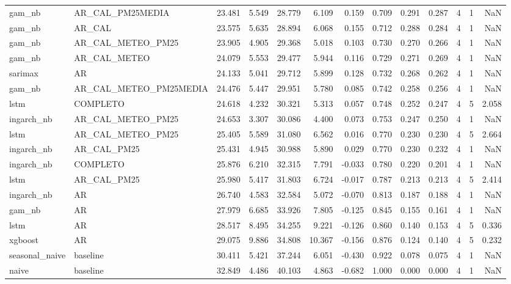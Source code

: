 \begin{tabular}{llrrrrrrrrrrr}
gam_nb & AR_CAL_PM25MEDIA & 23.481 & 5.549 & 28.779 & 6.109 & 0.159 & 0.709 & 0.291 & 0.287 & 4 & 1 & NaN \\
gam_nb & AR_CAL & 23.575 & 5.635 & 28.894 & 6.068 & 0.155 & 0.712 & 0.288 & 0.284 & 4 & 1 & NaN \\
gam_nb & AR_CAL_METEO_PM25 & 23.905 & 4.905 & 29.368 & 5.018 & 0.103 & 0.730 & 0.270 & 0.266 & 4 & 1 & NaN \\
gam_nb & AR_CAL_METEO & 24.079 & 5.553 & 29.477 & 5.944 & 0.116 & 0.729 & 0.271 & 0.269 & 4 & 1 & NaN \\
sarimax & AR & 24.133 & 5.041 & 29.712 & 5.899 & 0.128 & 0.732 & 0.268 & 0.262 & 4 & 1 & NaN \\
gam_nb & AR_CAL_METEO_PM25MEDIA & 24.476 & 5.447 & 29.951 & 5.780 & 0.085 & 0.742 & 0.258 & 0.256 & 4 & 1 & NaN \\
lstm & COMPLETO & 24.618 & 4.232 & 30.321 & 5.313 & 0.057 & 0.748 & 0.252 & 0.247 & 4 & 5 & 2.058 \\
ingarch_nb & AR_CAL_METEO_PM25 & 24.653 & 3.307 & 30.086 & 4.400 & 0.073 & 0.753 & 0.247 & 0.250 & 4 & 1 & NaN \\
lstm & AR_CAL_METEO_PM25 & 25.405 & 5.589 & 31.080 & 6.562 & 0.016 & 0.770 & 0.230 & 0.230 & 4 & 5 & 2.664 \\
ingarch_nb & AR_CAL_PM25 & 25.431 & 4.945 & 30.988 & 5.890 & 0.029 & 0.770 & 0.230 & 0.232 & 4 & 1 & NaN \\
ingarch_nb & COMPLETO & 25.876 & 6.210 & 32.315 & 7.791 & -0.033 & 0.780 & 0.220 & 0.201 & 4 & 1 & NaN \\
lstm & AR_CAL_PM25 & 25.980 & 5.417 & 31.803 & 6.724 & -0.017 & 0.787 & 0.213 & 0.213 & 4 & 5 & 2.414 \\
ingarch_nb & AR & 26.740 & 4.583 & 32.584 & 5.072 & -0.070 & 0.813 & 0.187 & 0.188 & 4 & 1 & NaN \\
gam_nb & AR & 27.979 & 6.685 & 33.926 & 7.805 & -0.125 & 0.845 & 0.155 & 0.161 & 4 & 1 & NaN \\
lstm & AR & 28.517 & 8.495 & 34.255 & 9.221 & -0.126 & 0.860 & 0.140 & 0.153 & 4 & 5 & 0.336 \\
xgboost & AR & 29.075 & 9.886 & 34.808 & 10.367 & -0.156 & 0.876 & 0.124 & 0.140 & 4 & 5 & 0.232 \\
seasonal_naive & baseline & 30.411 & 5.421 & 37.244 & 6.051 & -0.430 & 0.922 & 0.078 & 0.075 & 4 & 1 & NaN \\
naive & baseline & 32.849 & 4.486 & 40.103 & 4.863 & -0.682 & 1.000 & 0.000 & 0.000 & 4 & 1 & NaN \\
\bottomrule
\end{tabular}
